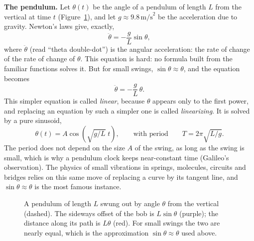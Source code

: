 \begin{applicationbox}
\textbf{The pendulum.} Let $\theta(t)$ be the angle of a pendulum of length $L$ from the vertical at time $t$ (Figure~\ref{ch04:fig-pendulum}), and let $g \approx 9.8\,\text{m/s}^2$ be the acceleration due to gravity. Newton's laws give, exactly,
\[
  \ddot\theta = -\frac{g}{L}\sin\theta,
\]
where $\ddot\theta$ (read ``theta double-dot'') is the angular acceleration: the rate of change of the rate of change of $\theta$. This equation is hard: no formula built from the familiar functions solves it. But for small swings, $\sin\theta \approx \theta$, and the equation becomes
\[
  \ddot\theta = -\frac{g}{L}\,\theta.
\]
This simpler equation is called \emph{linear}, because $\theta$ appears only to the first power, and replacing an equation by such a simpler one is called \emph{linearizing}. It is solved by a pure sinusoid,
\[
  \theta(t) = A\cos\!\left(\sqrt{g/L}\;t\right),
  \qquad\text{with period}\qquad
  T = 2\pi\sqrt{L/g}.
\]
The period does not depend on the size $A$ of the swing, as long as the swing is small, which is why a pendulum clock keeps near-constant time (Galileo's observation). The physics of small vibrations in springs, molecules, circuits and bridges relies on this same move of replacing a curve by its tangent line, and $\sin\theta\approx\theta$ is the most famous instance.
\end{applicationbox}

\begin{figure}[htbp]
\centering
{}
\caption{A pendulum of length $L$ swung out by angle $\theta$ from the vertical (dashed). The sideways offset of the bob is $L\sin\theta$ (purple); the distance along its path is $L\theta$ (red). For small swings the two are nearly equal, which is the approximation $\sin\theta\approx\theta$ used above.}
\label{ch04:fig-pendulum}
\end{figure}

